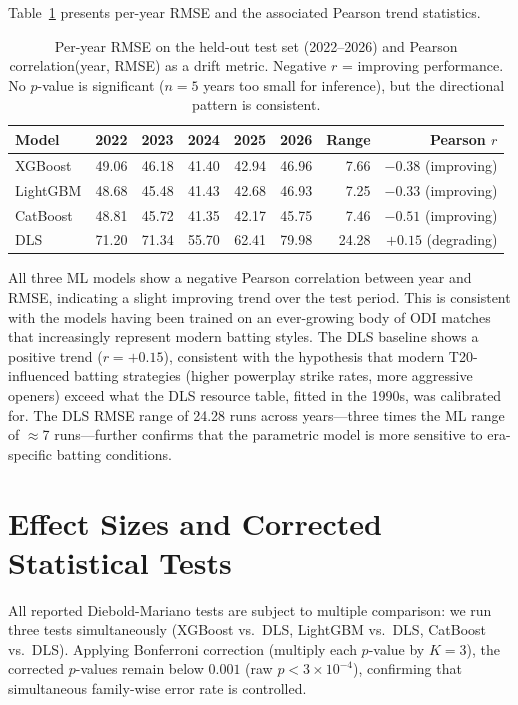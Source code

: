 \documentclass[12pt,a4paper,oneside]{report}
\begin{document}
Table~\ref{tab:drift} presents per-year RMSE and the associated Pearson trend statistics.

\begin{table}[htbp]
\centering
\caption[Per-year RMSE and concept drift trend statistics]{Per-year RMSE on the held-out test set (2022--2026) and Pearson correlation(year, RMSE) as a drift metric.  Negative $r$ = improving performance.  No $p$-value is significant ($n=5$ years too small for inference), but the directional pattern is consistent.}
\label{tab:drift}
\small
\begin{tabular}{lrrrrrrr}
\toprule
\textbf{Model} & \textbf{2022} & \textbf{2023} & \textbf{2024} & \textbf{2025} & \textbf{2026} & \textbf{Range} & \textbf{Pearson $r$} \\
\midrule
XGBoost  & 49.06 & 46.18 & 41.40 & 42.94 & 46.96 & 7.66 & $-0.38$ (improving) \\
LightGBM & 48.68 & 45.48 & 41.43 & 42.68 & 46.93 & 7.25 & $-0.33$ (improving) \\
CatBoost & 48.81 & 45.72 & 41.35 & 42.17 & 45.75 & 7.46 & $-0.51$ (improving) \\
DLS      & 71.20 & 71.34 & 55.70 & 62.41 & 79.98 & 24.28 & $+0.15$ (degrading) \\
\bottomrule
\end{tabular}
\end{table}

All three ML models show a negative Pearson correlation between year and RMSE, indicating a slight improving trend over the test period.  This is consistent with the models having been trained on an ever-growing body of ODI matches that increasingly represent modern batting styles.  The DLS baseline shows a positive trend ($r = +0.15$), consistent with the hypothesis that modern T20-influenced batting strategies (higher powerplay strike rates, more aggressive openers) exceed what the DLS resource table, fitted in the 1990s, was calibrated for.  The DLS RMSE range of 24.28 runs across years---three times the ML range of $\approx$7 runs---further confirms that the parametric model is more sensitive to era-specific batting conditions.

\section{Effect Sizes and Corrected Statistical Tests}
\label{sec:effect_sizes}

All reported Diebold-Mariano tests are subject to multiple comparison: we run three tests simultaneously (XGBoost vs.\ DLS, LightGBM vs.\ DLS, CatBoost vs.\ DLS).  Applying Bonferroni correction (multiply each $p$-value by $K=3$), the corrected $p$-values remain below $0.001$ (raw $p < 3 \times 10^{-4}$), confirming that simultaneous family-wise error rate is controlled.
\end{document}
